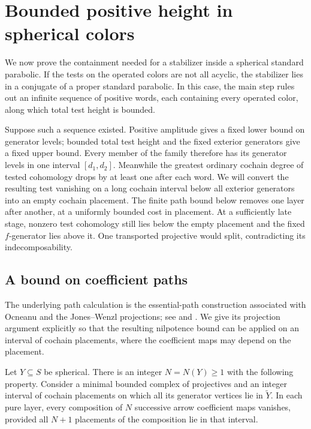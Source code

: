 \section{Bounded positive height in spherical colors}
\label{sec:spherical}

We now prove the containment needed for a stabilizer inside a spherical
standard parabolic.  If the tests on the operated colors are not all
acyclic, the stabilizer lies in a conjugate of a proper standard
parabolic.  In this case, the main step rules out an infinite sequence
of positive words, each containing every operated color, along which
total test height is bounded.

Suppose such a sequence existed.  Positive amplitude gives a fixed
lower bound on generator levels; bounded total test height and the
fixed exterior generators give a fixed upper bound.  Every member of
the family therefore has its generator levels in one interval
$[d_1,d_2]$.  Meanwhile the greatest ordinary cochain degree of tested
cohomology drops by at least one after each word.  We will convert the
resulting test vanishing on a long cochain interval below all exterior
generators into an empty cochain placement.  The finite path bound
below removes one layer after another, at a uniformly bounded cost in
placement.  At a sufficiently late stage, nonzero test cohomology still
lies below the empty placement and the fixed $f$-generator lies above
it.  One transported projective would split, contradicting its
indecomposability.

\subsection{A bound on coefficient paths}

The underlying path calculation is the essential-path construction
associated with Ocneanu and the Jones--Wenzl projections; see
\cite[Sections~3.1--3.2]{Coquereaux2002} and
\cite[Theorem~5.4.3 and Proposition~5.6.10]{Cooper2007}.
We give its projection argument explicitly so that the resulting
nilpotence bound can be applied on an interval of cochain placements,
where the coefficient maps may depend on the placement.

\begin{lemma}\label{sph:path-bound}
Let \(Y\subseteq S\) be spherical.  There is an integer \(N=N(Y)\geq1\)
with the following property.  Consider a minimal bounded complex
of projectives and an integer interval of cochain placements on
which all its generator vertices lie in \(\widetilde Y\).
In each pure layer, every composition of \(N\) successive arrow
coefficient maps vanishes, provided all \(N+1\) placements of the
composition lie in that interval.
\end{lemma}

